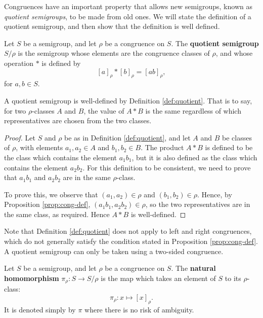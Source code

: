 Congruences have an important property that allows new semigroups, known as
\textit{quotient semigroups}, to be made from old ones.  We will state the
definition of a quotient semigroup, and then show that the definition is well
defined.

\begin{definition}
  \label{def:quotient}
  Let $S$ be a semigroup, and let $\rho$ be a congruence on $S$.  The
  \textbf{quotient semigroup} $S / \rho$ is the semigroup whose elements are the
  congruence classes of $\rho$, and whose operation $*$ is defined by
  $$[a]_\rho * [b]_\rho = [ab]_\rho,$$
  for $a, b \in S$.
\end{definition}

\begin{proposition}
  \label{thm:quotient-well-defined}
  A quotient semigroup is well-defined by Definition \ref{def:quotient}.  That
  is to say, for two $\rho$-classes $A$ and $B$, the value of $A * B$ is the
  same regardless of which representatives are chosen from the two classes.
  \begin{proof}
    Let $S$ and $\rho$ be as in Definition \ref{def:quotient}, and let $A$ and
    $B$ be classes of $\rho$, with elements $a_1,a_2 \in A$ and $b_1,b_2 \in B$.
    The product $A*B$ is defined to be the class which contains the element
    $a_1b_1$, but it is also defined as the class which contains the element
    $a_2b_2$.  For this definition to be consistent, we need to prove that
    $a_1b_1$ and $a_2b_2$ are in the same $\rho$-class.

    To prove this, we observe that $(a_1,a_2) \in \rho$ and
    $(b_1,b_2) \in \rho$.  Hence, by Proposition \ref{prop:cong-def},
    $(a_1b_1, a_2b_2) \in \rho$, so the two representatives are in the same
    class, as required.  Hence $A * B$ is well-defined.
  \end{proof}
\end{proposition}

Note that Definition \ref{def:quotient} does not apply to left and right
congruences, which do not generally satisfy the condition stated in Proposition
\ref{prop:cong-def}.  A quotient semigroup can only be taken using a two-sided
congruence.

\begin{definition}
  \label{def:natural-homomorphism}
  Let $S$ be a semigroup, and let $\rho$ be a congruence on $S$.  The
  \textbf{natural homomorphism} $\pi_\rho: S \to S / \rho$ is the map which
  takes an element of $S$ to its $\rho$-class:
  $$\pi_\rho: x \mapsto [x]_\rho.$$
  It is denoted simply by $\pi$ where there is no risk of ambiguity.
\end{definition}


